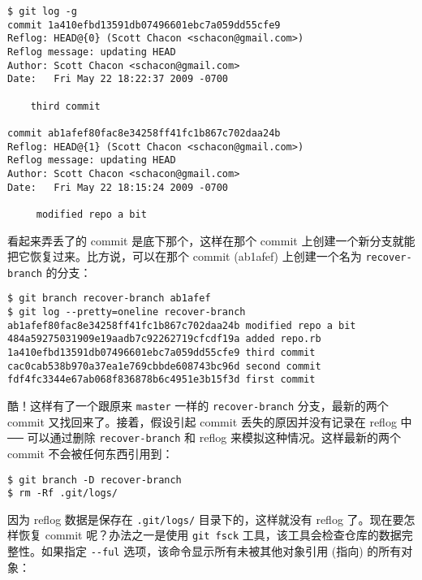 \documentclass[a4paper]{book}
\begin{document}
\begin{shaded}\begin{verbatim}
$ git log -g
commit 1a410efbd13591db07496601ebc7a059dd55cfe9
Reflog: HEAD@{0} (Scott Chacon <schacon@gmail.com>)
Reflog message: updating HEAD
Author: Scott Chacon <schacon@gmail.com>
Date:   Fri May 22 18:22:37 2009 -0700

    third commit

commit ab1afef80fac8e34258ff41fc1b867c702daa24b
Reflog: HEAD@{1} (Scott Chacon <schacon@gmail.com>)
Reflog message: updating HEAD
Author: Scott Chacon <schacon@gmail.com>
Date:   Fri May 22 18:15:24 2009 -0700

     modified repo a bit
\end{verbatim}\end{shaded}

看起来弄丢了的 commit 是底下那个，这样在那个 commit 上创建一个新分支就能把它恢复过来。比方说，可以在那个 commit (ab1afef) 上创建一个名为 \texttt{recover-branch} 的分支：

\begin{shaded}\begin{verbatim}
$ git branch recover-branch ab1afef
$ git log --pretty=oneline recover-branch
ab1afef80fac8e34258ff41fc1b867c702daa24b modified repo a bit
484a59275031909e19aadb7c92262719cfcdf19a added repo.rb
1a410efbd13591db07496601ebc7a059dd55cfe9 third commit
cac0cab538b970a37ea1e769cbbde608743bc96d second commit
fdf4fc3344e67ab068f836878b6c4951e3b15f3d first commit
\end{verbatim}\end{shaded}

酷！这样有了一个跟原来 \texttt{master} 一样的 \texttt{recover-branch} 分支，最新的两个 commit 又找回来了。接着，假设引起 commit 丢失的原因并没有记录在 reflog 中 ── 可以通过删除 \texttt{recover-branch} 和 reflog 来模拟这种情况。这样最新的两个 commit 不会被任何东西引用到：

\begin{shaded}\begin{verbatim}
$ git branch -D recover-branch
$ rm -Rf .git/logs/
\end{verbatim}\end{shaded}

因为 reflog 数据是保存在 \texttt{.git/logs/} 目录下的，这样就没有 reflog 了。现在要怎样恢复 commit 呢？办法之一是使用 \texttt{git fsck} 工具，该工具会检查仓库的数据完整性。如果指定 \texttt{-{}-ful} 选项，该命令显示所有未被其他对象引用 (指向) 的所有对象：
\end{document}
